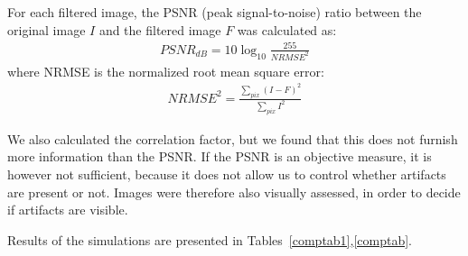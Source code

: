 For 
each filtered image, the PSNR (peak signal-to-noise)
ratio between the original image $I$ and the 
filtered image $F$ was calculated as:
\begin{eqnarray}
PSNR_{dB} = 10 \log_{10} \frac{255}{NRMSE^2}
\end{eqnarray}
where NRMSE is the normalized root mean square error:
\begin{eqnarray}
NRMSE^2  = \frac {\sum_{pix} (I - F)^2}{\sum_{pix} I^2}
\end{eqnarray}

We  also calculated the correlation factor, but we found that this
does not furnish more information than the PSNR. If the PSNR is an objective
measure, it is however not sufficient, because it does not allow us to 
control whether artifacts are present or not. Images were therefore also
visually assessed,  in order to decide if artifacts are visible.

Results of the simulations are presented in 
Tables~\ref{comptab1},\ref{comptab}.

$ $

